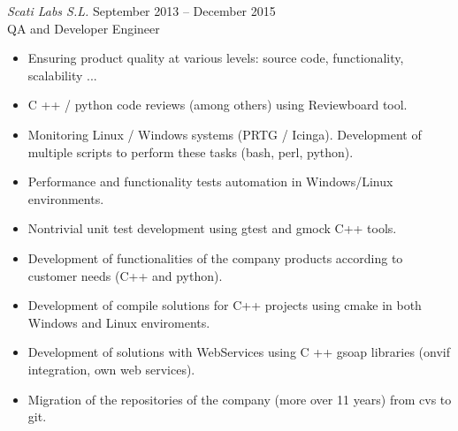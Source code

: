 \documentclass[10pt]{res} %
\begin{document}
\begin{resume}
{\sl Scati Labs S.L.} \hfill September 2013 -- December 2015\\
\hfill QA and Developer Engineer
\begin{itemize} \itemsep -2pt %
\item Ensuring product quality at various levels: source code, functionality, scalability ...
\item C ++ / python code reviews (among others) using Reviewboard tool.
\item Monitoring Linux / Windows systems (PRTG / Icinga). Development of multiple scripts to perform these tasks (bash, perl, python).
\item Performance and functionality tests automation in Windows/Linux environments.
\item Nontrivial unit test development using gtest and gmock C++ tools.
\item Development of functionalities of the company products according to customer needs (C++ and python).
\item Development of compile solutions for C++ projects using cmake in both Windows and Linux enviroments.
\item Development of solutions with WebServices using C ++ gsoap libraries (onvif integration, own web services).
\item Migration of the repositories of the company (more over 11 years) from cvs to git.
\end{itemize}


\end{resume}
\end{document}

